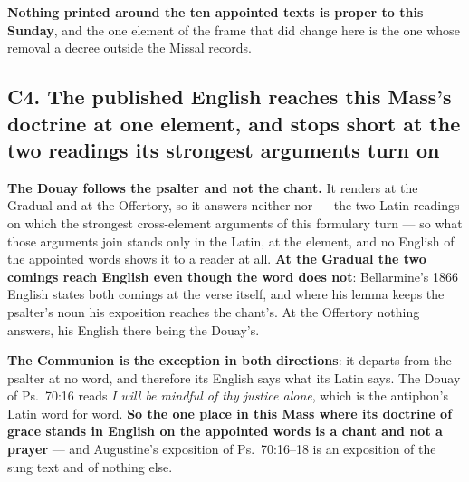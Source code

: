 \textbf{Nothing printed around the ten appointed texts is proper to this
Sunday}, and the one element of the frame that did change here is the one whose
removal a decree outside the Missal records.

\subsection*{C4. The published English reaches this Mass's doctrine at one element, and stops short at the two readings its strongest arguments turn on}

\textbf{The Douay follows the psalter and not the chant.} It renders
 at the Gradual and  at the Offertory, so
it answers neither  nor  ---
the two Latin readings on which the strongest cross-element arguments of this
formulary turn --- so what those arguments join stands only in the Latin, at the
element, and no English of the appointed words shows it to a reader at all.
\textbf{At the Gradual the two comings reach English even though the word does
not}: Bellarmine's 1866 English states both comings at the verse itself, and
where his lemma keeps the psalter's noun his exposition reaches the chant's. At
the Offertory nothing answers, his English there being the Douay's.

\textbf{The Communion is the exception in both directions}: it departs from the
psalter at no word, and therefore its English says what its Latin says. The
Douay of Ps.~70:16 reads \emph{I will be mindful of thy justice alone}, which is
the antiphon's Latin word for word. \textbf{So the one place in this Mass where
its doctrine of grace stands in English on the appointed words is a chant and
not a prayer} --- and Augustine's exposition of Ps.~70:16--18 is an exposition of
the sung text and of nothing else.

